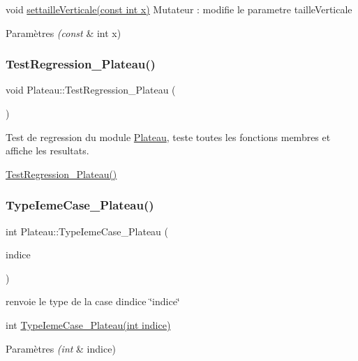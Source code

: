 void \hyperlink{classPlateau_a1a3e541307dfe02361517a26a442b74b}{settaille\+Verticale(const int x)} Mutateur \+: modifie le parametre taille\+Verticale 


\begin{DoxyParams}{Paramètres}
{\em (const} & int x) \\
\hline
\end{DoxyParams}
\mbox{\label{classPlateau_a80e520c24aeee0863fb9838cfc9364e7}} 
\subsubsection{\texorpdfstring{Test\+Regression\+\_\+\+Plateau()}{TestRegression\_Plateau()}}
{\footnotesize\ttfamily void Plateau\+::\+Test\+Regression\+\_\+\+Plateau (\begin{DoxyParamCaption}{ }\end{DoxyParamCaption})}



Test de regression du module \hyperlink{classPlateau}{Plateau}, teste toutes les fonctions membres et affiche les resultats. 

\hyperlink{classPlateau_a80e520c24aeee0863fb9838cfc9364e7}{Test\+Regression\+\_\+\+Plateau()} \mbox{\label{classPlateau_ac96fb6f6cd0e74e43d2342ed2344b09e}} 
\subsubsection{\texorpdfstring{Type\+Ieme\+Case\+\_\+\+Plateau()}{TypeIemeCase\_Plateau()}}
{\footnotesize\ttfamily int Plateau\+::\+Type\+Ieme\+Case\+\_\+\+Plateau (\begin{DoxyParamCaption}\item[{const int}]{indice }\end{DoxyParamCaption})}



renvoie le type de la case d\textquotesingle{}indice \char`\"{}indice\char`\"{} 

int \hyperlink{classPlateau_ac96fb6f6cd0e74e43d2342ed2344b09e}{Type\+Ieme\+Case\+\_\+\+Plateau(int indice)} 
\begin{DoxyParams}{Paramètres}
{\em (int} & indice) \\
\hline
\end{DoxyParams}
\mbox{\label{classPlateau_a104d21bb84fcf7d170052118946bf78c}} 
